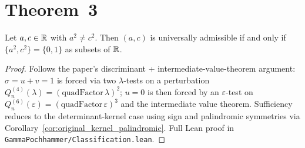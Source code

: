 \section{Theorem~3}

\begin{theorem}
  \label{thm:centered_classification}
  \leanok
  Let $a, c \in \mathbb{R}$ with $a^2 \neq c^2$.  Then $(a,c)$ is universally
  admissible if and only if $\{a^2, c^2\} = \{0, 1\}$ as subsets of
  $\mathbb{R}$.
\end{theorem}

\begin{proof}
  \leanok
  Follows the paper's discriminant + intermediate-value-theorem
  argument: $\sigma = u + v = 1$ is forced via two $\lambda$-tests on a
  perturbation $Q_n^{(4)}(\lambda) = (\text{quadFactor}\,\lambda)^2$;
  $u = 0$ is then forced by an $\varepsilon$-test on
  $Q_n^{(6)}(\varepsilon) = (\text{quadFactor}\,\varepsilon)^3$ and
  the intermediate value theorem.  Sufficiency reduces to the
  determinant-kernel case using sign and palindromic symmetries via
  Corollary~\ref{cor:original_kernel_palindromic}.  Full Lean proof in
  \texttt{GammaPochhammer/Classification.lean}.
\end{proof}
